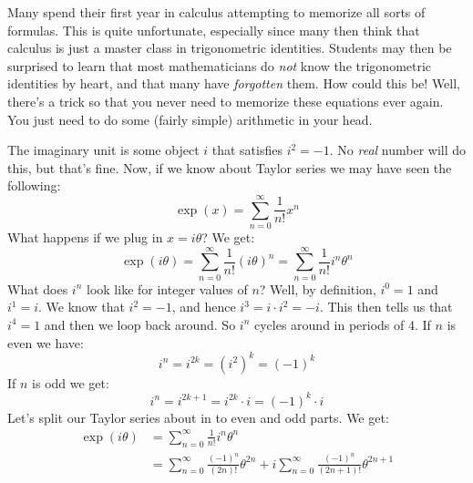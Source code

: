 \documentclass{article}
\theoremstyle{normal}
\newenvironment{example}{%
    \pushQED{\qed}\renewcommand{\qedsymbol}{$\blacksquare$}\examplex%
}{%
    \popQED\endexamplex%
}
\begin{document}
    \begin{example}[\textbf{Euler's Formula}]
        Many spend their first year in calculus attempting to memorize all
        sorts of formulas. This is quite unfortunate, especially since many
        then think that calculus is just a master class in trigonometric
        identities. Students may then be surprised to learn that most
        mathematicians do \textit{not} know the trigonometric identities by
        heart, and that many have \textit{forgotten} them. How could this be!
        Well, there's a trick so that you never need to memorize these
        equations ever again. You just need to do some (fairly simple)
        arithmetic in your head.
        \par\hfill\par
        The imaginary unit is some object $i$ that satisfies $i^{2}=-1$. No
        \textit{real} number will do this, but that's fine. Now,
        if we know about Taylor series we may have seen the following:
        \begin{equation}
            \exp(x)=\sum_{n=0}^{\infty}\frac{1}{n!}x^{n}
        \end{equation}
        What happens if we plug in $x=i\theta$? We get:
        \begin{equation}
            \exp(i\theta)=\sum_{n=0}^{\infty}\frac{1}{n!}(i\theta)^{n}
            =\sum_{n=0}^{\infty}\frac{1}{n!}i^{n}\theta^{n}
        \end{equation}
        What does $i^{n}$ look like for integer values of $n$? Well,
        by definition, $i^{0}=1$ and $i^{1}=i$. We know that $i^{2}=-1$, and
        hence $i^{3}=i\cdot{i}^{2}=-i$. This then tells us that $i^{4}=1$ and
        then we loop back around. So $i^{n}$ cycles around in periods of 4.
        If $n$ is even we have:
        \begin{equation}
            i^{n}=i^{2k}=(i^{2})^{k}=(-1)^{k}
        \end{equation}
        If $n$ is odd we get:
        \begin{equation}
            i^{n}=i^{2k+1}=i^{2k}\cdot{i}=(-1)^{k}\cdot{i}
        \end{equation}
        Let's split our Taylor series about in to even and odd parts. We get:
        \begin{align}
            \exp(i\theta)
            &=\sum_{n=0}^{\infty}\frac{1}{n!}i^{n}\theta^{n}\\
            &=\sum_{n=0}^{\infty}\frac{(-1)^{n}}{(2n)!}\theta^{2n}
            +i\sum_{n=0}^{\infty}\frac{(-1)^{n}}{(2n+1)!}\theta^{2n+1}

\end{align}
\end{example}
\end{document}
